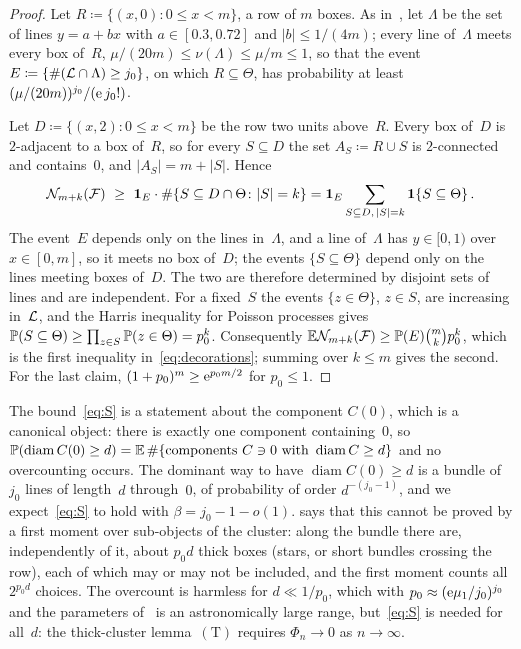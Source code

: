 \documentclass[11pt,letterpaper]{article}
\DeclareMathOperator{\diam}{diam}
\begin{document}
\begin{proof}
Let $R\coloneqq\{(x,0)\colon0\le x<m\}$, a row of $m$ boxes. As in~\cite[Proposition~4.1]{PS26}, let $\Lambda$ be the set of lines $y=a+bx$ with $a\in[0.3,0.72]$ and $\lvert b\rvert\le1/(4m)$; every line of~$\Lambda$ meets every box of~$R$, $\mu/(20m)\le\nu(\Lambda)\le\mu/m\le1$, so that the event $E\coloneqq\{\#(\cL\cap\Lambda)\ge j_0\}$, on which $R\subseteq\Theta$, has probability at least $(\mu/(20m))^{j_0}/(\e\,j_0!)$.

Let $D\coloneqq\{(x,2)\colon0\le x<m\}$ be the row two units above~$R$. Every box of~$D$ is $2$-adjacent to a box of~$R$, so for every $S\subseteq D$ the set $A_S\coloneqq R\cup S$ is $2$-connected and contains~$0$, and $\lvert A_S\rvert=m+\lvert S\rvert$. Hence
\begin{equation*}
  \mathcal N_{m+k}(\mathcal F)\ \ge\ \1_E\cdot\#\{S\subseteq D\cap\Theta\colon\lvert S\rvert=k\}=\1_E\sum_{S\subseteq D,\,\lvert S\rvert=k}\1\{S\subseteq\Theta\}\,.
\end{equation*}
The event~$E$ depends only on the lines in~$\Lambda$, and a line of~$\Lambda$ has $y\in[0,1)$ over $x\in[0,m]$, so it meets no box of~$D$; the events $\{S\subseteq\Theta\}$ depend only on the lines meeting boxes of~$D$. The two are therefore determined by disjoint sets of lines and are independent. For a fixed~$S$ the events $\{z\in\Theta\}$, $z\in S$, are increasing in~$\cL$, and the Harris inequality for Poisson processes gives $\P(S\subseteq\Theta)\ge\prod_{z\in S}\P(z\in\Theta)=p_0^k$. Consequently $\E\mathcal N_{m+k}(\mathcal F)\ge\P(E)\binom mkp_0^k$, which is the first inequality in~\eqref{eq:decorations}; summing over $k\le m$ gives the second. For the last claim, $(1+p_0)^m\ge\e^{p_0m/2}$ for $p_0\le1$.
\end{proof}

\begin{remark}
\label{rem:meaning}
The bound~\eqref{eq:S} is a statement about the component $C(0)$, which is a canonical object: there is exactly one component containing~$0$, so $\P(\diam C(0)\ge d)=\E\,\#\{\text{components }C\ni0\text{ with }\diam C\ge d\}$ and no overcounting occurs. The dominant way to have $\diam C(0)\ge d$ is a bundle of $j_0$ lines of length~$d$ through~$0$, of probability of order $d^{-(j_0-1)}$, and we expect~\eqref{eq:S} to hold with $\beta=j_0-1-o(1)$.  says that this cannot be proved by a first moment over sub-objects of the cluster: along the bundle there are, independently of it, about $p_0d$ thick boxes (stars, or short bundles crossing the row), each of which may or may not be included, and the first moment counts all $2^{p_0d}$ choices. The overcount is harmless for $d\ll1/p_0$, which with $p_0\approx(\e\mu_1/j_0)^{j_0}$ and the parameters of~\cite{SC26} is an astronomically large range, but~\eqref{eq:S} is needed for all~$d$: the thick-cluster lemma~$\mathrm{(T)}$ requires $\Phi_n\to0$ as $n\to\infty$.
\end{remark}
\end{document}
